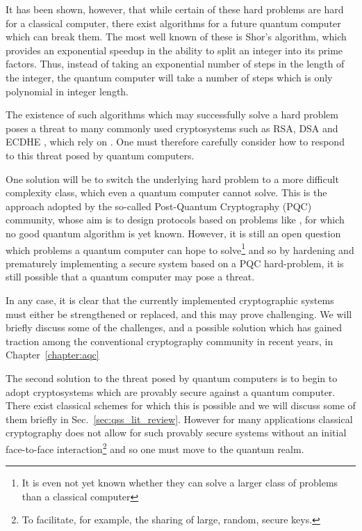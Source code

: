 It has been shown, however, that while certain of these hard problems are hard for a classical computer, there exist algorithms for a future quantum computer which can break them. The most well known of these is Shor's algorithm, \cite{Shor1997} which provides an exponential speedup in the ability to split an integer into its prime factors. Thus, instead of taking an exponential number of steps in the length of the integer, the quantum computer will take a number of steps which is only polynomial in integer length. 

The existence of such algorithms which may successfully solve a hard problem poses a threat to many commonly used cryptosystems such as RSA, DSA and ECDHE , which rely on . One must therefore carefully consider how to respond to this threat posed by quantum computers. 

One solution will be to switch the underlying hard problem to a more difficult complexity class, which even a quantum computer cannot solve. This is the approach adopted by the so-called Post-Quantum Cryptography (PQC) community, whose aim is to design protocols based on problems like , for which no good quantum algorithm is yet known. However, it is still an open question which problems a quantum computer can hope to solve\footnote{It is even not yet known whether they can solve a larger class of problems than a classical computer} and so by hardening and prematurely implementing a secure system based on a PQC hard-problem, it is still possible that a quantum computer may pose a threat.  

In any case, it is clear that the currently implemented cryptographic systems must either be strengthened or replaced, and this may prove challenging. We will briefly discuss some of the challenges, and a possible solution which has gained traction among the conventional cryptography community in recent years, in Chapter~\ref{chapter:aqc}

The second solution to the threat posed by quantum computers is to begin to adopt cryptosystems which are provably secure against a quantum computer. There exist classical schemes for which this is possible and we will discuss some of them briefly in Sec.~\ref{sec:qss_lit_review}. However for many applications classical cryptography does not allow for such provably secure systems without an initial face-to-face interaction\footnote{To facilitate, for example, the sharing of large, random, secure keys.} and so one must move to the quantum realm.

